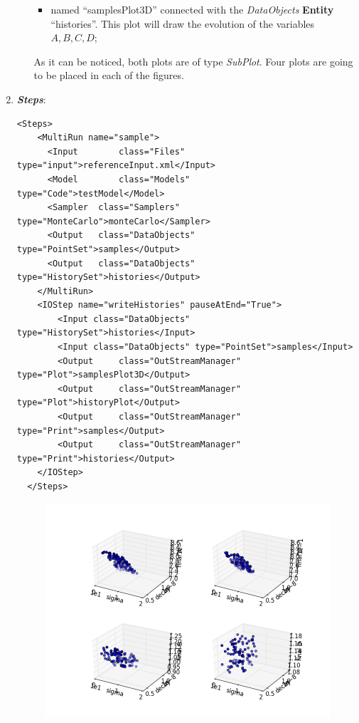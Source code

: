 \begin{enumerate}
\begin{itemize}
\begin{itemize}
      \item named ``samplesPlot3D'' connected with the  
      \textit{DataObjects} \textbf{Entity} ``histories''. This plot will draw the 
      evolution of the variables $A,B,C,D$;
    \end{itemize}
     As it can be noticed, both plots are of type \textit{SubPlot}. Four plots
     are going to be placed in each of the figures.
  \end{itemize}   
   \item \textbf{\textit{Steps}}:   
\begin{lstlisting}[style=XML,morekeywords={arg,extension,pauseAtEnd,overwrite}]
  <Steps>
    <MultiRun name="sample">
      <Input 	    class="Files" 			 type="input">referenceInput.xml</Input>
      <Model 	    class="Models" 		 type="Code">testModel</Model>
      <Sampler 	class="Samplers" 		 type="MonteCarlo">monteCarlo</Sampler>
      <Output 	class="DataObjects"  type="PointSet">samples</Output>
      <Output 	class="DataObjects"  type="HistorySet">histories</Output>
    </MultiRun>
    <IOStep name="writeHistories" pauseAtEnd="True">
        <Input class="DataObjects" type="HistorySet">histories</Input>
        <Input class="DataObjects" type="PointSet">samples</Input>
        <Output 	class="OutStreamManager" type="Plot">samplesPlot3D</Output>
        <Output 	class="OutStreamManager" type="Plot">historyPlot</Output>
        <Output 	class="OutStreamManager" type="Print">samples</Output>
        <Output 	class="OutStreamManager" type="Print">histories</Output>
    </IOStep>
  </Steps>
\end{lstlisting}
 \begin{figure}[h!]
  \centering
  \includegraphics[scale=0.7]{pics/MC_pointsets.png}

\end{figure}
\end{enumerate}
